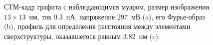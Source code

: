 \documentclass[a4paper, 12pt]{article}
\begin{document}
	\begin{figure}[H]
		\centering
		\caption{СТМ-кадр графита с наблюдающимся муаром, размер изображения $13\times13$~нм, ток 0.3~нА, напряжение 297~мВ (a), его Фурье-образ (b), профиль для определения расстояния между элементами сверхструктуры, оказавшегося равным 3.82~нм (c).}
		\label{fig:2_muar}
	\end{figure}
\end{document}
